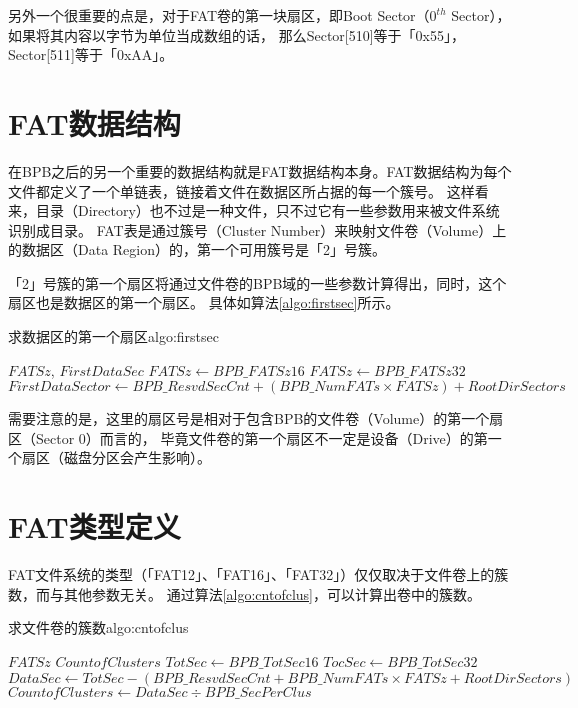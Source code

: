 另外一个很重要的点是，对于FAT卷的第一块扇区，即Boot Sector（$0^{th}$ Sector），如果将其内容以字节为单位当成数组的话，
那么Sector[510]等于「0x55」，Sector[511]等于「0xAA」。

\section{FAT数据结构}
\label{sec:datastruct}

在BPB之后的另一个重要的数据结构就是FAT数据结构本身。FAT数据结构为每个文件都定义了一个单链表，链接着文件在数据区所占据的每一个簇号。
这样看来，目录（Directory）也不过是一种文件，只不过它有一些参数用来被文件系统识别成目录。
FAT表是通过簇号（Cluster Number）来映射文件卷（Volume）上的数据区（Data Region）的，第一个可用簇号是「2」号簇。

「2」号簇的第一个扇区将通过文件卷的BPB域的一些参数计算得出，同时，这个扇区也是数据区的第一个扇区。
具体如算法\ref{algo:firstsec}所示。
\begin{balgo}{求数据区的第一个扇区}{algo:firstsec}
\begin{algorithmic}
\Ensure $FATSz$, $FirstDataSec$
    \State $FATSz \gets BPB\_FATSz16$
\Else
    \State $FATSz \gets BPB\_FATSz32$
\EndIf
\State $FirstDataSector \gets BPB\_ResvdSecCnt + (BPB\_NumFATs \times FATSz) + RootDirSectors$
\end{algorithmic}
\end{balgo}

需要注意的是，这里的扇区号是相对于包含BPB的文件卷（Volume）的第一个扇区（Sector 0）而言的，
毕竟文件卷的第一个扇区不一定是设备（Drive）的第一个扇区（磁盘分区会产生影响）。


\section{FAT类型定义}  %
\label{sec:fattype}

FAT文件系统的类型（「FAT12」、「FAT16」、「FAT32」）仅仅取决于文件卷上的簇数，而与其他参数无关。
通过算法\ref{algo:cntofclus}，可以计算出卷中的簇数。
\begin{balgo}{求文件卷的簇数}{algo:cntofclus}
\begin{algorithmic}
\Require $FATSz$
\Ensure $CountofClusters$
    \State $TotSec \gets BPB\_TotSec16$
\Else
    \State $TocSec \gets BPB\_TotSec32$
\EndIf
\State $DataSec \gets TotSec - (BPB\_ResvdSecCnt + BPB\_NumFATs \times FATSz + RootDirSectors)$
\State $CountofClusters \gets DataSec \div BPB\_SecPerClus$
\end{algorithmic}
\end{balgo}

